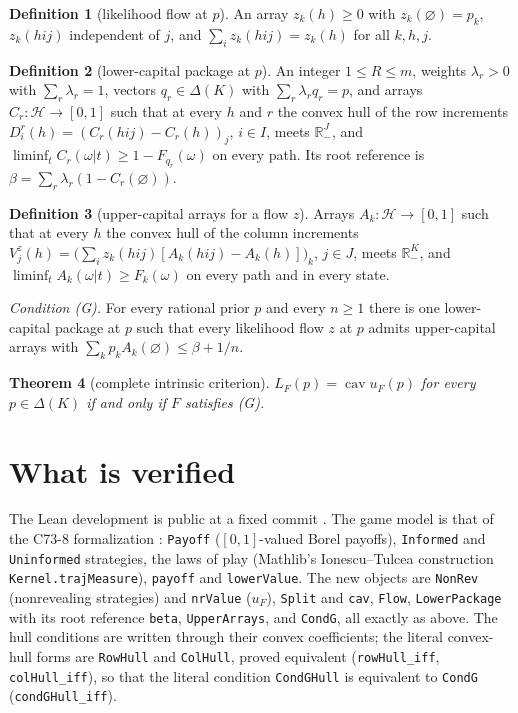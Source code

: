 \documentclass[11pt]{article}
\newtheorem{theorem}{Theorem}
\theoremstyle{definition}
\newtheorem{definition}[theorem]{Definition}
\newcommand{\R}{\mathbb R}
\begin{document}
\begin{definition}[likelihood flow at $p$]
An array $z_k(h)\ge0$ with $z_k(\varnothing)=p_k$, $z_k(hij)$ independent of $j$, and $\sum_iz_k(hij)=z_k(h)$ for all $k,h,j$.
\end{definition}

\begin{definition}[lower-capital package at $p$]
An integer $1\le R\le m$, weights $\lambda_r>0$ with $\sum_r\lambda_r=1$, vectors $q_r\in\Delta(K)$ with $\sum_r\lambda_rq_r=p$, and arrays $C_r:\mathcal H\to[0,1]$ such that at every $h$ and $r$ the convex hull of the row increments $D^r_i(h)=(C_r(hij)-C_r(h))_j$, $i\in I$, meets $\R^J_-$, and $\liminf_tC_r(\omega|t)\ge1-F_{q_r}(\omega)$ on every path. Its root reference is $\beta=\sum_r\lambda_r(1-C_r(\varnothing))$.
\end{definition}

\begin{definition}[upper-capital arrays for a flow $z$]
Arrays $A_k:\mathcal H\to[0,1]$ such that at every $h$ the convex hull of the column increments $V^z_j(h)=\big(\sum_iz_k(hij)[A_k(hij)-A_k(h)]\big)_k$, $j\in J$, meets $\R^K_-$, and $\liminf_tA_k(\omega|t)\ge F_k(\omega)$ on every path and in every state.
\end{definition}

\emph{Condition (G).} For every rational prior $p$ and every $n\ge1$ there is one lower-capital package at $p$ such that every likelihood flow $z$ at $p$ admits upper-capital arrays with $\sum_kp_kA_k(\varnothing)\le\beta+1/n$.

\begin{theorem}[complete intrinsic criterion]\label{main}
$L_F(p)=\operatorname{cav}u_F(p)$ for every $p\in\Delta(K)$ if and only if $F$ satisfies (G).
\end{theorem}

\section{What is verified}

The Lean development is public at a fixed commit \cite{Lean}. The game model is that of the C73-8 formalization \cite{Lean8}: \texttt{Payoff} ($[0,1]$-valued Borel payoffs), \texttt{Informed} and \texttt{Uninformed} strategies, the laws of play (Mathlib's Ionescu--Tulcea construction \texttt{Kernel.trajMeasure}), \texttt{payoff} and \texttt{lowerValue}. The new objects are \texttt{NonRev} (nonrevealing strategies) and \texttt{nrValue} ($u_F$), \texttt{Split} and \texttt{cav}, \texttt{Flow}, \texttt{LowerPackage} with its root reference \texttt{beta}, \texttt{UpperArrays}, and \texttt{CondG}, all exactly as above. The hull conditions are written through their convex coefficients; the literal convex-hull forms are \texttt{RowHull} and \texttt{ColHull}, proved equivalent (\texttt{rowHull\_iff}, \texttt{colHull\_iff}), so that the literal condition \texttt{CondGHull} is equivalent to \texttt{CondG} (\texttt{condGHull\_iff}).
\end{document}
